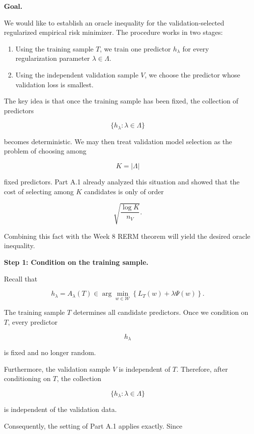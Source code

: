 \documentclass[11pt]{article}
\begin{document}
\begin{enumerate}
\begin{solutionbox}

\textbf{Goal.}

We would like to establish an oracle inequality for the validation-selected regularized empirical risk minimizer. The procedure works in two stages:

\begin{enumerate}
    \item Using the training sample $T$, we train one predictor $h_\lambda$ for every regularization parameter $\lambda\in\Lambda$.
    \item Using the independent validation sample $V$, we choose the predictor whose validation loss is smallest.
\end{enumerate}

The key idea is that once the training sample has been fixed, the collection of predictors

\[
\{h_\lambda:\lambda\in\Lambda\}
\]

becomes deterministic. We may then treat validation model selection as the problem of choosing among

\[
K=|\Lambda|
\]

fixed predictors. Part A.1 already analyzed this situation and showed that the cost of selecting among $K$ candidates is only of order

\[
\sqrt{\frac{\log K}{n_V}}.
\]

Combining this fact with the Week 8 RERM theorem will yield the desired oracle inequality.

\medskip

\textbf{Step 1: Condition on the training sample.}

Recall that

\[
h_\lambda
=
A_\lambda(T)
\in
\arg\min_{w\in\mathcal W}
\left\{
L_T(w)+\lambda\Psi(w)
\right\}.
\]

The training sample $T$ determines all candidate predictors. Once we condition on $T$, every predictor

\[
h_\lambda
\]

is fixed and no longer random.

Furthermore, the validation sample $V$ is independent of $T$. Therefore, after conditioning on $T$, the collection

\[
\{h_\lambda:\lambda\in\Lambda\}
\]

is independent of the validation data.

Consequently, the setting of Part A.1 applies exactly. Since


\end{solutionbox}
\end{enumerate}
\end{document}
